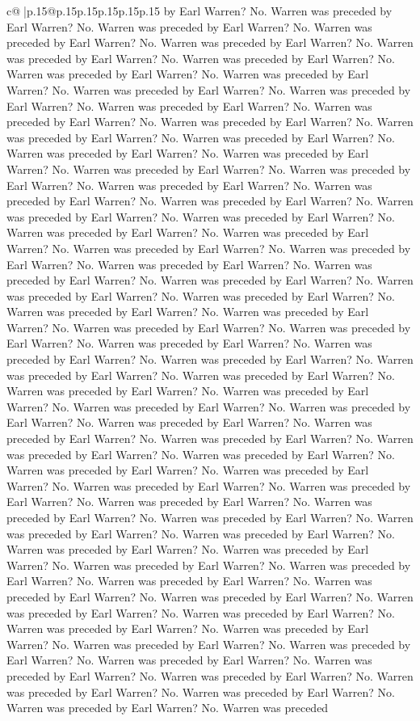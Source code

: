 \documentclass{article}
\begin{document}
{\begin{supertabular}{c@{$\;$}|p{.15\linewidth}@{}p{.15\linewidth}p{.15\linewidth}p{.15\linewidth}p{.15\linewidth}p{.15\linewidth}}
{{{by Earl Warren? No. Warren was preceded by Earl Warren? No. Warren was preceded by Earl Warren? No. Warren was preceded by Earl Warren? No. Warren was preceded by Earl Warren? No. Warren was preceded by Earl Warren? No. Warren was preceded by Earl Warren? No. Warren was preceded by Earl Warren? No. Warren was preceded by Earl Warren? No. Warren was preceded by Earl Warren? No. Warren was preceded by Earl Warren? No. Warren was preceded by Earl Warren? No. Warren was preceded by Earl Warren? No. Warren was preceded by Earl Warren? No. Warren was preceded by Earl Warren? No. Warren was preceded by Earl Warren? No. Warren was preceded by Earl Warren? No. Warren was preceded by Earl Warren? No. Warren was preceded by Earl Warren? No. Warren was preceded by Earl Warren? No. Warren was preceded by Earl Warren? No. Warren was preceded by Earl Warren? No. Warren was preceded by Earl Warren? No. Warren was preceded by Earl Warren? No. Warren was preceded by Earl Warren? No. Warren was preceded by Earl Warren? No. Warren was preceded by Earl Warren? No. Warren was preceded by Earl Warren? No. Warren was preceded by Earl Warren? No. Warren was preceded by Earl Warren? No. Warren was preceded by Earl Warren? No. Warren was preceded by Earl Warren? No. Warren was preceded by Earl Warren? No. Warren was preceded by Earl Warren? No. Warren was preceded by Earl Warren? No. Warren was preceded by Earl Warren? No. Warren was preceded by Earl Warren? No. Warren was preceded by Earl Warren? No. Warren was preceded by Earl Warren? No. Warren was preceded by Earl Warren? No. Warren was preceded by Earl Warren? No. Warren was preceded by Earl Warren? No. Warren was preceded by Earl Warren? No. Warren was preceded by Earl Warren? No. Warren was preceded by Earl Warren? No. Warren was preceded by Earl Warren? No. Warren was preceded by Earl Warren? No. Warren was preceded by Earl Warren? No. Warren was preceded by Earl Warren? No. Warren was preceded by Earl Warren? No. Warren was preceded by Earl Warren? No. Warren was preceded by Earl Warren? No. Warren was preceded by Earl Warren? No. Warren was preceded by Earl Warren? No. Warren was preceded by Earl Warren? No. Warren was preceded by Earl Warren? No. Warren was preceded by Earl Warren? No. Warren was preceded by Earl Warren? No. Warren was preceded by Earl Warren? No. Warren was preceded by Earl Warren? No. Warren was preceded by Earl Warren? No. Warren was preceded by Earl Warren? No. Warren was preceded by Earl Warren? No. Warren was preceded by Earl Warren? No. Warren was preceded by Earl Warren? No. Warren was preceded by Earl Warren? No. Warren was preceded by Earl Warren? No. Warren was preceded by Earl Warren? No. Warren was preceded by Earl Warren? No. Warren was preceded by Earl Warren? No. Warren was preceded by Earl Warren? No. Warren was preceded by Earl Warren? No. Warren was preceded by Earl Warren? No. Warren was preceded by Earl Warren? No. Warren was preceded by Earl Warren? No. Warren was preceded by Earl Warren? No. Warren was preceded by Earl Warren? No. Warren was preceded by Earl Warren? No. Warren was preceded by Earl Warren? No. Warren was preceded by Earl Warren? No. Warren was preceded }}}
\end{supertabular}}
\end{document}
